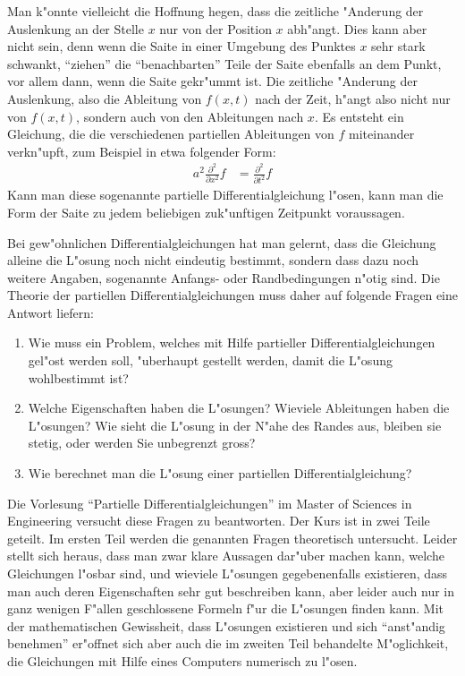 Man k"onnte vielleicht die Hoffnung hegen, dass die zeitliche "Anderung
der Auslenkung an der Stelle $x$ nur von der Position $x$ abh"angt.
Dies kann aber nicht sein, denn wenn die Saite in einer Umgebung
des Punktes $x$ sehr stark schwankt, ``ziehen'' die ``benachbarten'' Teile
der Saite ebenfalls an dem Punkt, vor allem dann, wenn die Saite gekr"ummt
ist. Die zeitliche "Anderung der Auslenkung, also die Ableitung von $f(x,t)$
nach der Zeit, h"angt also nicht nur von $f(x,t)$, sondern auch von
den Ableitungen nach $x$. Es entsteht ein Gleichung, die die verschiedenen
partiellen Ableitungen von $f$ miteinander verkn"upft, zum Beispiel in
etwa folgender Form:
\begin{align*}
a^2\frac{\partial^2}{\partial x^2}f&= \frac{\partial^2}{\partial t^2}f
\end{align*}
Kann man diese sogenannte partielle Differentialgleichung l"osen,
kann man die Form der Saite zu jedem
beliebigen zuk"unftigen Zeitpunkt voraussagen.

Bei gew"ohnlichen Differentialgleichungen hat man gelernt, dass die Gleichung
alleine die L"osung noch nicht eindeutig bestimmt, sondern dass dazu noch
weitere Angaben, sogenannte Anfangs- oder Randbedingungen n"otig sind.
Die Theorie der partiellen Differentialgleichungen muss daher auf folgende
Fragen eine Antwort liefern:
\begin{enumerate}
\item Wie muss ein Problem, welches mit Hilfe partieller Differentialgleichungen
gel"ost werden soll, "uberhaupt gestellt werden, damit die L"osung wohlbestimmt
ist?
\item Welche Eigenschaften haben die L"osungen? Wieviele Ableitungen haben
die L"osungen? Wie sieht die L"osung in der N"ahe des Randes aus, bleiben
sie stetig, oder werden Sie unbegrenzt gross?
\item Wie berechnet man die L"osung einer partiellen Differentialgleichung?
\end{enumerate}
Die Vorlesung ``Partielle Differentialgleichungen'' im Master of Sciences in
Engineering versucht diese Fragen zu beantworten. Der Kurs ist in zwei Teile
geteilt. Im ersten Teil werden die genannten Fragen theoretisch untersucht.
Leider stellt sich heraus, dass man zwar klare Aussagen dar"uber machen kann,
welche Gleichungen l"osbar sind, und wieviele L"osungen gegebenenfalls
existieren, dass man auch deren Eigenschaften sehr gut beschreiben kann,
aber leider auch nur in ganz wenigen F"allen geschlossene Formeln f"ur die
L"osungen finden kann. Mit der mathematischen Gewissheit, dass L"osungen
existieren und sich ``anst"andig benehmen'' er"offnet sich aber auch die
im zweiten Teil behandelte M"oglichkeit, die Gleichungen mit Hilfe eines
Computers numerisch zu l"osen.

